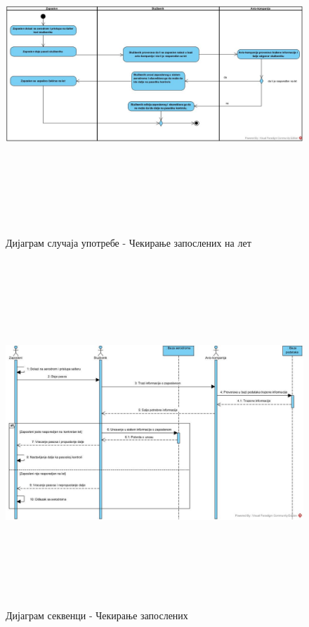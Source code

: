 \documentclass{article}
\begin{document}
\begin{figure}[H]
    \centering
    \includegraphics[width=1.1\textwidth, height=12cm]{Dijagrami_slike/cekiranje_zaposlenih.jpg}
    \caption{Дијаграм случаја употребе - Чекирање запослених на лет}
\end{figure}

\begin{figure}[H]
    \begin{center}
        \includegraphics[width=1.1\textwidth, height=13cm]{Dijagrami_slike/ds_cekiranje_zaposlenih.jpg}
        \caption{Дијаграм секвенци - Чекирање запослених}
    \end{center}
\end{figure}
\end{document}
